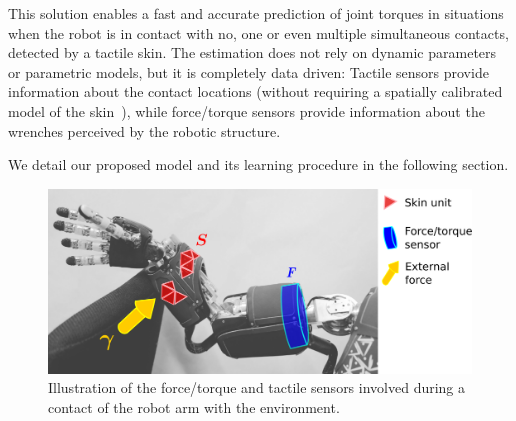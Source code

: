         This solution enables a fast and accurate prediction of joint torques in situations when the robot is in contact with no, one or even multiple simultaneous contacts, detected by a tactile skin.
        The estimation does not rely on dynamic parameters or parametric models, but it is completely data driven: Tactile sensors provide information about the contact locations (without requiring a spatially calibrated model of the skin~\cite{DelPrete2011}), while force/torque sensors provide information about the wrenches perceived by the robotic structure.

        We detail our proposed model and its learning procedure in the following section.

%
\begin{figure}[t]
  \centering
  \includegraphics[width=.5\columnwidth]{robertoIROS/fig/concept_gray}		
  \caption{Illustration of the force/torque and tactile sensors involved during a contact of the robot arm with the environment.}
  \label{fig:concept}
\end{figure}
%

